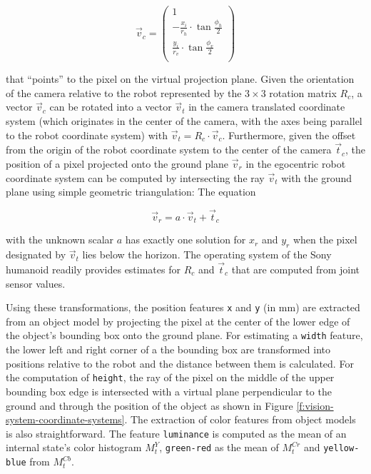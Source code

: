 $$
\vec{v}_{c}= \begin{pmatrix}1\\
  -\frac{x_i}{r_{h}} \cdot \tan\frac{\phi_{h}}{2}\\
  \frac{y_i}{r_{v}} \cdot \tan\frac{\phi_{v}}{2}\\
\end{pmatrix}
$$

\noindent that ``points'' to the pixel on the virtual projection
plane. Given the orientation of the camera relative to the robot
represented by the $3\times3$ rotation matrix $R_{c}$, a vector
$\vec{v}_c$ can be rotated into a vector $\vec{v}_t$ in the camera
translated coordinate system (which originates in the center of the
camera, with the axes being parallel to the robot coordinate system)
with $\vec{v}_{t}=R_{c} \cdot \vec{v}_{c}$. Furthermore, given the
offset from the origin of the robot coordinate system to the center of
the camera $\vec{t}_{c}$, the position of a pixel projected onto the
ground plane $\vec{v}_r$ in the egocentric robot coordinate system can
be computed by intersecting the ray $\vec{v}_{t}$ with the ground
plane using simple geometric triangulation: The equation

$$
\vec{v}_r= a \cdot \vec{v}_t + \vec{t}_c
$$

\noindent with the unknown scalar $a$ has exactly one solution for
$x_r$ and $y_r$ when the pixel designated by $\vec{v}_t$ lies below
the horizon.  The operating system of the Sony humanoid readily
provides estimates for $R_{c}$ and $\vec{t}_{c}$ that are computed
from joint sensor values.

Using these transformations, the position features {\tt x} and {\tt y}
(in mm) are extracted from an object model by projecting the pixel at
the center of the lower edge of the object's bounding box onto the
ground plane. For estimating a {\tt width} feature, the lower left and
right corner of a the bounding box are transformed into positions
relative to the robot and the distance between them is calculated. For
the computation of {\tt height}, the ray of the pixel on the middle of
the upper bounding box edge is intersected with a virtual plane
perpendicular to the ground and through the position of the object as
shown in Figure \ref{f:vision-system-coordinate-systems}.  The
extraction of color features from object models is also
straightforward. The feature {\tt luminance} is computed as the mean
of an internal state's color histogram $M_t^{Y}$, {\tt green-red} as
the mean of $M_t^{Cr}$ and {\tt yellow-blue} from
$M_t^{Cb}$. %

